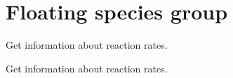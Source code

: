 \hypertarget{group__floating}{
\section{\-Floating species group}
\label{group__floating}
}


\-Get information about reaction rates.  


\-Get information about reaction rates. 